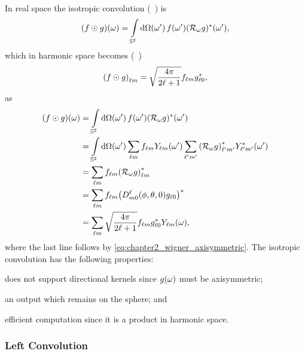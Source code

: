 In real space the isotropic convolution (\eg{}~\cite{McEwen2007,Wei2011,Kennedy2011}) is
%
\begin{equation}
	\pixel{(f \odot g)}
	= \integrateSphere{\omega'} \pixel[']{f} \pixel[']{\conj{(\rotation{\omega}g)}},
\end{equation}
%
which in harmonic space becomes (\eg{}~\cite{McEwen2007})
%
\begin{equation}\label{eq:chapter2_isotropic_harmonic}
	\harmonic{(f \odot g)}
	= \sqrt{\inverseFactor} \harmonic{f} \conj{\axiHarmonic{g}},
\end{equation}
%
as
%
\begin{align}
	\pixel{(f \odot g)}
	 & = \integrateSphere{\omega'} \pixel[']{f} \pixel[']{\conj{(\rotation{\omega}g)}} \nonumber{}                                                                                           \\
	 & = \integrateSphere{\omega'} \harmonicSum \harmonic{f} \pixel[']{\harmonic{Y}} \harmonicSum['] \conj{\harmonic[']{(\rotation{\omega}g)}} \pixel[']{\conj{\harmonic[']{Y}}} \nonumber{} \\
	 & = \harmonicSum \harmonic{f} \conj{\harmonic{(\rotation{\omega}g)}} \nonumber                                                                                                          \\
	 & = \harmonicSum \harmonic{f} \conj{\big(\wigner{\ell}{m}{0}(\phi,\theta,0) \axiHarmonic{g}\big)} \nonumber{}                                                                           \\
	 & = \harmonicSum \sqrt{\inverseFactor} \harmonic{f} \conj{\axiHarmonic{g}} \pixel{\harmonic{Y}},
\end{align}
%
where the last line follows by \cref{eq:chapter2_wigner_axisymmetric}.
The isotropic convolution has the following properties:
%
\begin{inparaenum}[(i)]
	\item does not support directional kernels since \(\pixel{g}\) must be axisymmetric;
	\item an output which remains on the sphere; and
	\item efficient computation since it is a product in harmonic space.
\end{inparaenum}

\subsubsection{Left Convolution}

